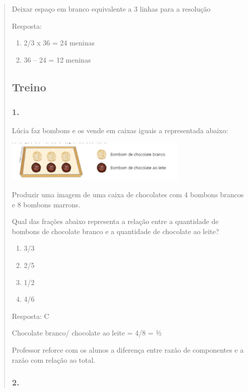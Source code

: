 \begin{enumerate}
\begin{escolha}
\begin{enumerate}
\begin{itemize}
\begin{itemize}
\begin{escolha}
\begin{quote}
\begin{escolha}
{Deixar espaço em branco equivalente a 3 linhas para a resolução

Resposta:

\begin{enumerate}
\def\labelenumi{\alph{enumi})}
\item
  2/3 x 36 = 24 meninas
\item
  36 -- 24 = 12 meninas
\end{enumerate}

\subsection{Treino}\label{treino-8}

\subsubsection{1.}\label{section-114}

Lúcia faz bombons e os vende em caixas iguais a representada abaixo:

\includegraphics[width=3.43363in,height=0.77507in]{media/image122.png}

Produzir uma imagem de uma caixa de chocolates com 4 bombons brancos e 8
bombons marrons.

Qual das frações abaixo representa a relação entre a quantidade de
bombons de chocolate branco e a quantidade de chocolate ao leite?

\begin{enumerate}
\def\labelenumi{\alph{enumi})}
\item
  3/3
\item
  2/5
\item
  1/2
\item
  4/6
\end{enumerate}

Resposta: C

Chocolate branco/ chocolate ao leite = 4/8 = ½

Professor reforce com os alunos a diferença entre razão de componentes e
a razão com relação ao total.

\subsubsection{2.}\label{section-115}

}
\end{escolha}
\end{quote}
\end{escolha}
\end{itemize}
\end{itemize}
\end{enumerate}
\end{escolha}
\end{enumerate}
